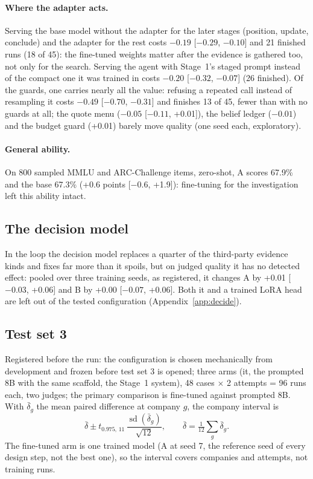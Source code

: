 \documentclass[11pt]{article}
\begin{document}
\paragraph{Where the adapter acts.} Serving the base model without the adapter for the later stages (position,
update, conclude) and the adapter for the rest costs $-0.19$ [$-0.29$, $-0.10$] and 21 finished runs (18 of 45): the
fine-tuned weights matter after the evidence is gathered too, not only for the search. Serving the agent with
Stage~1's staged prompt instead of the compact one it was trained in costs $-0.20$ [$-0.32$, $-0.07$] (26 finished).
Of the guards, one carries nearly all the value: refusing a repeated call instead of resampling it costs $-0.49$ [$-0.70$, $-0.31$] and finishes 13 of 45, fewer than with no guards at all; the quote menu ($-0.05$ [$-0.11$, +0.01]),
the belief ledger ($-0.01$) and the budget guard (+0.01) barely move quality (one seed each, exploratory).

\paragraph{General ability.} On 800 sampled MMLU and ARC-Challenge items, zero-shot, A scores 67.9\% and the base
67.3\% (+0.6 points [$-0.6$, +1.9]): fine-tuning for the investigation left this ability intact.

\subsection{The decision model}
\label{sec:decide}

In the loop the decision model replaces a quarter of the third-party evidence kinds and fixes far more than it spoils,
but on judged quality it has no detected effect: pooled over three training seeds, as registered, it changes A by
+0.01 [$-0.03$, +0.06] and B by +0.00 [$-0.07$, +0.06]. Both it and a trained LoRA head are left out of the tested configuration (Appendix~\ref{app:decide}).

\subsection{Test set 3}
\label{sec:test3run}

Registered before the run: the configuration is chosen mechanically from development and frozen before test set 3
is opened; three arms (it, the prompted 8B with the same scaffold, the Stage~1 system), 48 cases $\times$ 2 attempts
= 96 runs each, two judges; the primary comparison is fine-tuned against prompted 8B.
With $\bar\delta_g$ the mean paired difference at company $g$, the company interval is
\begin{equation}
\bar\delta \pm t_{0.975,\,11} \, \frac{\operatorname{sd}(\bar\delta_g)}{\sqrt{12}}, \qquad \bar\delta = \tfrac{1}{12}\textstyle\sum_g \bar\delta_g .
\end{equation}
The fine-tuned arm is one trained model (A at seed 7, the reference seed of every design step, not the best one), so the
interval covers companies and attempts, not training runs.
\end{document}
